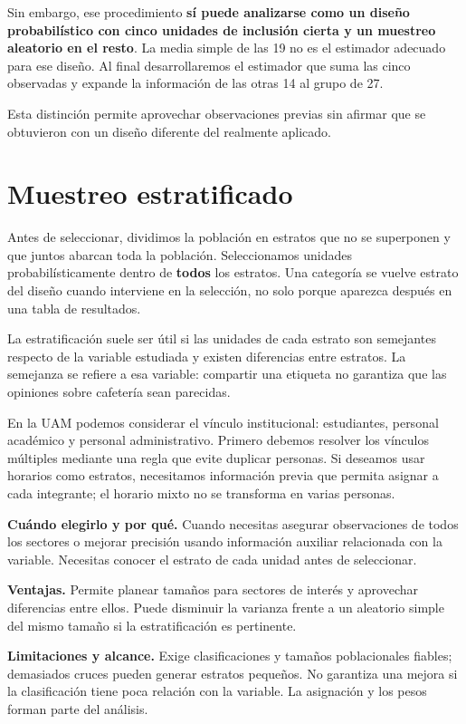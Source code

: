 \documentclass[11pt,letterpaper]{article}
\begin{document}
Sin embargo, ese procedimiento \textbf{sí puede analizarse como un diseño probabilístico con cinco unidades de inclusión cierta y un muestreo aleatorio en el resto}. La media simple de las 19 no es el estimador adecuado para ese diseño. Al final desarrollaremos el estimador que suma las cinco observadas y expande la información de las otras 14 al grupo de 27.

Esta distinción permite aprovechar observaciones previas sin afirmar que se obtuvieron con un diseño diferente del realmente aplicado.
\clearpage
\section{Muestreo estratificado}
Antes de seleccionar, dividimos la población en estratos que no se superponen y que juntos abarcan toda la población. Seleccionamos unidades probabilísticamente dentro de \textbf{todos} los estratos. Una categoría se vuelve estrato del diseño cuando interviene en la selección, no solo porque aparezca después en una tabla de resultados.

La estratificación suele ser útil si las unidades de cada estrato son semejantes respecto de la variable estudiada y existen diferencias entre estratos. La semejanza se refiere a esa variable: compartir una etiqueta no garantiza que las opiniones sobre cafetería sean parecidas.

En la UAM podemos considerar el vínculo institucional: estudiantes, personal académico y personal administrativo. Primero debemos resolver los vínculos múltiples mediante una regla que evite duplicar personas. Si deseamos usar horarios como estratos, necesitamos información previa que permita asignar a cada integrante; el horario mixto no se transforma en varias personas.

\textbf{Cuándo elegirlo y por qué.} Cuando necesitas asegurar observaciones de todos los sectores o mejorar precisión usando información auxiliar relacionada con la variable. Necesitas conocer el estrato de cada unidad antes de seleccionar.

\textbf{Ventajas.} Permite planear tamaños para sectores de interés y aprovechar diferencias entre ellos. Puede disminuir la varianza frente a un aleatorio simple del mismo tamaño si la estratificación es pertinente.

\textbf{Limitaciones y alcance.} Exige clasificaciones y tamaños poblacionales fiables; demasiados cruces pueden generar estratos pequeños. No garantiza una mejora si la clasificación tiene poca relación con la variable. La asignación y los pesos forman parte del análisis.
\end{document}

